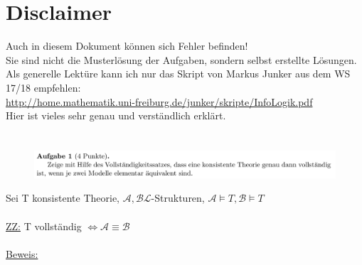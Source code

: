 \documentclass[a4paper]{scrartcl}
\begin{document}
\section*{Disclaimer}%
\label{sec:disclaimer}
Auch in diesem Dokument können sich Fehler befinden!\\
Sie sind nicht die Musterlösung der Aufgaben, sondern selbst erstellte Lösungen.\\

Als generelle Lektüre kann ich nur das Skript von Markus Junker aus dem WS 17/18 empfehlen:\\
\url{http://home.mathematik.uni-freiburg.de/junker/skripte/InfoLogik.pdf}\\
Hier ist vieles sehr genau und verständlich erklärt.%

\section*{}%
\label{sec:aufgabe_1}

    \begin{figure}[H]
        \includegraphics[scale=0.3]{./A-1.png}
        \label{fig:}
    \end{figure}

    Sei T konsistente Theorie, $\mathcal{A},\mathcal{B} \mathscr{L}$-Strukturen, $\mathcal{A} \vDash T, \mathcal{B} \vDash T$\\
    \\\underline{ZZ:} T vollständig $\Leftrightarrow \mathcal{A} \equiv \mathcal{B}$\\
    \\\underline{Beweis:}\\
\end{document}
